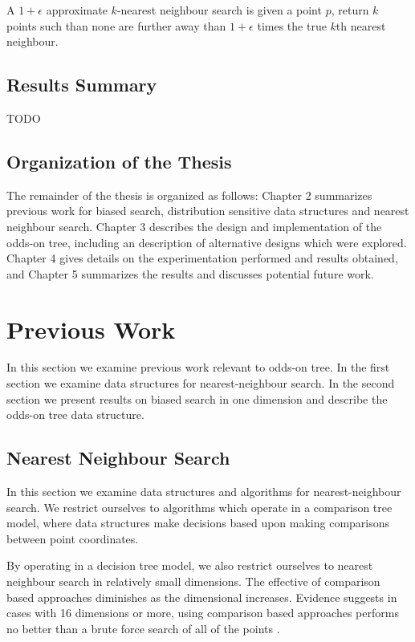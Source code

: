 \documentclass[mcs]{scsthesis}
\begin{document}
A \(1 + \epsilon\) approximate \(k\)-nearest neighbour search is given a point
\(p\), return \(k\) points such than none are further away than \(1 + \epsilon\)
times the true \(k\)th nearest neighbour.

\section{Results Summary}

TODO

\section{Organization of the Thesis}

The remainder of the thesis is organized as follows: Chapter 2 summarizes
previous work for biased search, distribution sensitive data structures and
nearest neighbour search.  Chapter 3 describes the design and implementation of
the odds-on tree, including an description of alternative designs which were
explored.  Chapter 4 gives details on the experimentation performed and results
obtained, and Chapter 5 summarizes the results and discusses potential 
future work.

\chapter{Previous Work}

In this section we examine previous work relevant to odds-on tree. In the first
section we examine data structures for nearest-neighbour search. In the second
section we present results on biased search in one dimension and describe
the odds-on tree data structure.

\section{Nearest Neighbour Search}

In this section we examine data structures and algorithms for nearest-neighbour
search. We restrict ourselves to algorithms which operate in a comparison tree
model, where data structures make decisions based upon making comparisons
between point coordinates.

By operating in a decision tree model, we also restrict ourselves to nearest
neighbour search in relatively small dimensions. The effective of comparison
based approaches diminishes as the dimensional increases. Evidence suggests in
cases with 16 dimensions or more, using comparison based approaches performs no
better than a brute force search of all of the points \cite{fastvector}.
\end{document}
